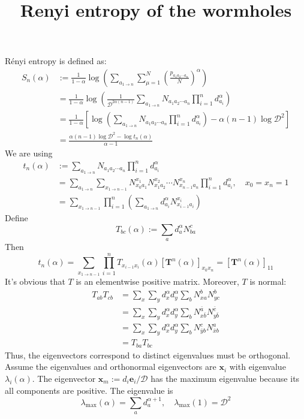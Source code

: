 \documentclass[11pt, letters]{article}
\title{Renyi entropy of the wormholes}
\author{\zpj}
\begin{document}
\maketitle
\newcommand{\suma}{\sum_{a_{1\to n}}}
\newcommand{\sumx}{\sum_{x_{1\to n-1}}}
\newcommand{\pd}{\prod_{i=1}^n d_{a_i}^\alpha}
\newcommand{\numa}{\suma N_{a_1a_2\cdots a_n}\pd}
\newcommand{\coresum}{\numa }

R\'enyi entropy is defined as:
\begin{align}
	S_n(\alpha)&:=\frac{1}{1-\alpha}\log\left(\suma\sum_{\mu=1}^{N}\left(\frac{p_{a_1a_2\cdots a_n}}{N}\right)^\alpha\right) \\
	&=\frac{1}{1-\alpha}\log\left(\frac{1}{\mathcal{D}^{2\alpha(n-1)}}\coresum \right) \\
	&=\frac{1}{1-\alpha}\left[\log\left(\coresum\right)-\alpha(n-1)\log \mathcal{D}^2\right]\\
	&=\frac{\alpha(n-1)\log \mathcal{D}^2-\log t_n(\alpha)}{\alpha-1}
\end{align}
We are using
\begin{align}
	t_n(\alpha)&:=\coresum\\
	&= \suma\sumx N_{x_0a_1}^{x_1}N_{x_1a_2}^{x_2}\cdots N_{x_{n-1}a_n}^{x_n}\pd,\quad x_0=x_n=1\\
	&= \sumx\prod_{i=1}^n\left(\suma d_{a_i}^\alpha N_{x_{i-1}a_i}^{x_i}\right)
\end{align}
Define \[T_{bc}(\alpha):=\sum_ad_a^\alpha N_{ba}^c\]
Then \[t_n(\alpha)=\sumx\prod_{i=1}^nT_{x_{i-1}x_i}(\alpha)\left[\bm T^n(\alpha)\right]_{x_0x_n}=\left[\bm T^n(\alpha)\right]_{11}
\label{t11}\]
It's obvious that $T$ is an elementwise positive matrix. Moreover, $T$ is normal:
\begin{align}\label{key}
T_{ab}T_{cb}&=\sum_x\sum_y d_x^\alpha d_y^\alpha \sum_b N_{xa}^b N_{yc}^b\\
&=\sum_x\sum_y d_x^\alpha d_y^\alpha \sum_b N_{x\bar b}^{\bar a} N_{y\bar b}^{\bar c}\\
&=\sum_x\sum_y d_x^\alpha d_y^\alpha \sum_b  N_{\bar y b}^{c}N_{\bar xb}^{a}\\
&=T_{ba}T_{bc}
\end{align}
Thus, the eigenvectors correspond to distinct eigenvalues must be orthogonal. Assume the eigenvalues and orthonormal eigenvectors are $\bm x_i$ with eigenvalue $\lambda_i(\alpha)$. The eigenvector $\bm x_m:=d_i\bm e_i/\mathcal{D}$ has the maximum eigenvalue because its all components are positive. The eigenvalue is
\[\lambda_{\max}(\alpha)=\sum_a d_a^{\alpha+1}, \quad\lambda_{\max}(1)=\mathcal{D}^2\]
\end{document}
